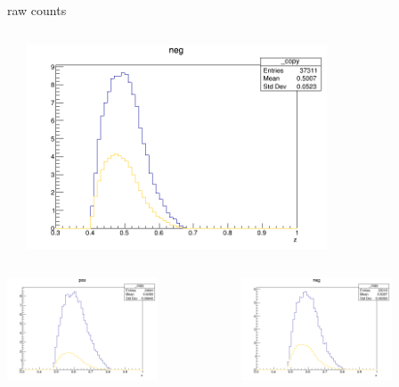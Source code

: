 \begin{frame}{raw counts}
\begin{columns}
\begin{column}[T]{0.25\textwidth}
\end{column}
\begin{column}[T]{0.25\textwidth}
\includegraphics[width = 0.7\textwidth]{results/yield/statistics/yield_x_Q2_z_0.60_4.775_0.50_neg.png}
\end{column}
\end{columns}
\begin{columns}
\begin{column}[T]{0.25\textwidth}
\includegraphics[width = 0.7\textwidth]{results/yield/statistics/yield_x_Q2_z_0.60_4.775_0.60_pos.png}
\end{column}
\begin{column}[T]{0.25\textwidth}
\includegraphics[width = 0.7\textwidth]{results/yield/statistics/yield_x_Q2_z_0.60_4.775_0.60_neg.png}

\end{column}
\end{columns}
\end{frame}
